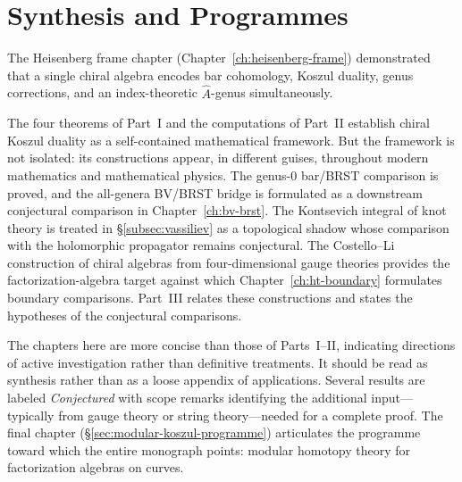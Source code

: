 \documentclass[11pt]{memoir}
\begin{document}


























\part{Synthesis and Programmes}

\noindent
The Heisenberg frame chapter (Chapter~\ref{ch:heisenberg-frame}) demonstrated
that a single chiral algebra encodes bar cohomology, Koszul duality, genus
corrections, and an index-theoretic $\hat{A}$-genus simultaneously.

The four theorems of Part~I and the computations of Part~II establish
chiral Koszul duality as a self-contained mathematical framework.  But the
framework is not isolated: its constructions appear, in different guises,
throughout modern mathematics and mathematical physics.  The genus-$0$
bar/BRST comparison is proved, and the all-genera BV/BRST bridge is
formulated as a downstream conjectural comparison in
Chapter~\ref{ch:bv-brst}.  The Kontsevich integral of knot theory is
treated in \S\ref{subsec:vassiliev} as a topological shadow whose
comparison with the holomorphic propagator remains conjectural.  The
Costello--Li construction of chiral algebras from four-dimensional
gauge theories provides the factorization-algebra target against which
Chapter~\ref{ch:ht-boundary} formulates boundary comparisons.  Part~III relates these constructions and states the hypotheses of the conjectural comparisons.

The chapters here are more concise than those of Parts~I--II,
indicating directions of active investigation rather than definitive
treatments.  It should be read as synthesis rather than as a loose
appendix of applications.  Several results are labeled
\emph{Conjectured} with scope
remarks identifying the additional input---typically from gauge theory or
string theory---needed for a complete proof.  The final chapter
(\S\ref{sec:modular-koszul-programme}) articulates the programme toward which
the entire monograph points: modular homotopy theory for factorization
algebras on curves.
\end{document}
